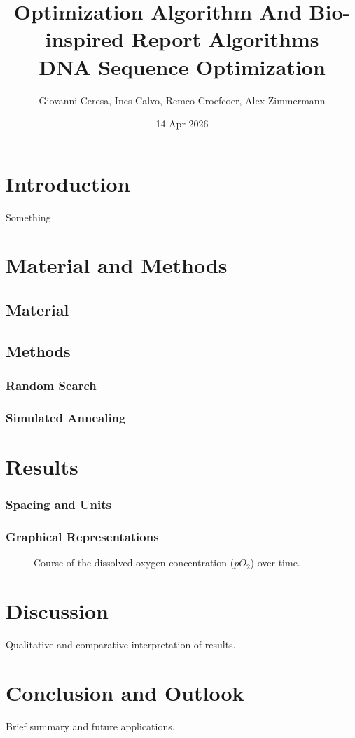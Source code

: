 \documentclass[12pt,a4paper]{article}
\title{
    \textbf{Optimization Algorithm And Bio-inspired Report Algorithms} \\[0.3cm]
    \large DNA Sequence Optimization
}
\author{
    Giovanni Ceresa, Ines Calvo, Remco Croefcoer, Alex Zimmermann
}
\date{14 Apr 2026}
\begin{document}
\maketitle
\vspace{10cm}
\begin{abstract}

\end{abstract}

\newpage
\tableofcontents
\newpage

\section{Introduction}

Something

\section{Material and Methods}
\subsection{Material}
\subsection{Methods}
\subsubsection{Random Search}
\subsubsection{Simulated Annealing}
\section{Results}
\subsubsection{Spacing and Units}
\subsubsection{Graphical Representations}
\begin{figure}[H]
\centering
\fbox{\rule{0pt}{5cm}\rule{0.8\textwidth}{0pt}}
\caption{Course of the dissolved oxygen concentration (\(pO_2\)) over time.}
\label{fig:oxygen}
\end{figure}

\section{Discussion}
Qualitative and comparative interpretation of results.

\section{Conclusion and Outlook}
Brief summary and future applications.
\end{document}
